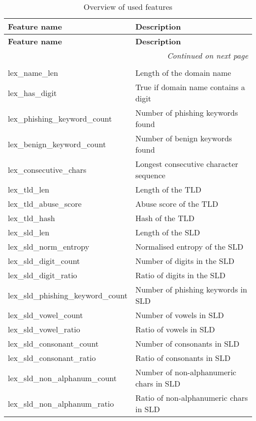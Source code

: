 \begin{longtable}{@{}ll@{}}
\caption{Overview of used features}\\
\toprule
\textbf{Feature name} & \textbf{Description} \\
\midrule
\endfirsthead

\toprule
\textbf{Feature name} & \textbf{Description} \\
\midrule
\endhead

\midrule
\multicolumn{2}{r}{\textit{Continued on next page}} \\
\midrule
\endfoot

\bottomrule
\endlastfoot

\multicolumn{2}{l}{\emph{Lexical features (lex\_)}} \\
lex\_name\_len & Length of the domain name \\
lex\_has\_digit & True if domain name contains a digit \\
lex\_phishing\_keyword\_count & Number of phishing keywords found \\
lex\_benign\_keyword\_count & Number of benign keywords found \\
lex\_consecutive\_chars & Longest consecutive character sequence \\
lex\_tld\_len & Length of the TLD \\
lex\_tld\_abuse\_score & Abuse score of the TLD \\
lex\_tld\_hash & Hash of the TLD \\
lex\_sld\_len & Length of the SLD \\
lex\_sld\_norm\_entropy & Normalised entropy of the SLD \\
lex\_sld\_digit\_count & Number of digits in the SLD \\
lex\_sld\_digit\_ratio & Ratio of digits in the SLD \\
lex\_sld\_phishing\_keyword\_count & Number of phishing keywords in SLD \\
lex\_sld\_vowel\_count & Number of vowels in SLD \\
lex\_sld\_vowel\_ratio & Ratio of vowels in SLD \\
lex\_sld\_consonant\_count & Number of consonants in SLD \\
lex\_sld\_consonant\_ratio & Ratio of consonants in SLD \\
lex\_sld\_non\_alphanum\_count & Number of non-alphanumeric chars in SLD \\
lex\_sld\_non\_alphanum\_ratio & Ratio of non-alphanumeric chars in SLD \\

\end{longtable}
